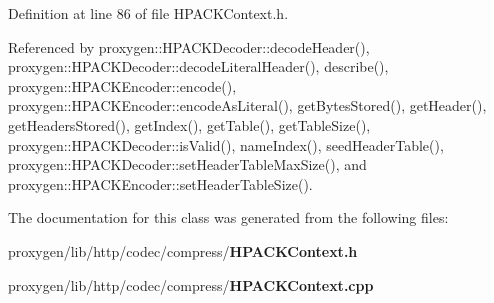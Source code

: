 Definition at line 86 of file H\+P\+A\+C\+K\+Context.\+h.



Referenced by proxygen\+::\+H\+P\+A\+C\+K\+Decoder\+::decode\+Header(), proxygen\+::\+H\+P\+A\+C\+K\+Decoder\+::decode\+Literal\+Header(), describe(), proxygen\+::\+H\+P\+A\+C\+K\+Encoder\+::encode(), proxygen\+::\+H\+P\+A\+C\+K\+Encoder\+::encode\+As\+Literal(), get\+Bytes\+Stored(), get\+Header(), get\+Headers\+Stored(), get\+Index(), get\+Table(), get\+Table\+Size(), proxygen\+::\+H\+P\+A\+C\+K\+Decoder\+::is\+Valid(), name\+Index(), seed\+Header\+Table(), proxygen\+::\+H\+P\+A\+C\+K\+Decoder\+::set\+Header\+Table\+Max\+Size(), and proxygen\+::\+H\+P\+A\+C\+K\+Encoder\+::set\+Header\+Table\+Size().



The documentation for this class was generated from the following files\+:\begin{DoxyCompactItemize}
\item 
proxygen/lib/http/codec/compress/{\bf H\+P\+A\+C\+K\+Context.\+h}\item 
proxygen/lib/http/codec/compress/{\bf H\+P\+A\+C\+K\+Context.\+cpp}\end{DoxyCompactItemize}
